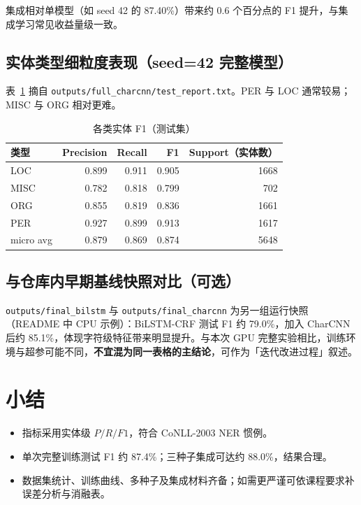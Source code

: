 \documentclass[UTF8,a4paper]{ctexart}
\begin{document}
集成相对单模型（如 seed 42 的 87.40\%）带来约 0.6 个百分点的 F1 提升，与集成学习常见收益量级一致。

\subsection{实体类型细粒度表现（seed=42 完整模型）}
表~\ref{tab:pertype} 摘自 \texttt{outputs/full\_charcnn/test\_report.txt}。PER 与 LOC 通常较易；MISC 与 ORG 相对更难。

\begin{table}[htbp]
  \centering
  \caption{各类实体 F1（测试集）}
  \label{tab:pertype}
  \begin{tabular}{lrrrr}
    \toprule
    类型 & Precision & Recall & F1 & Support（实体数） \\
    \midrule
    LOC & 0.899 & 0.911 & 0.905 & 1668 \\
    MISC & 0.782 & 0.818 & 0.799 & 702 \\
    ORG & 0.855 & 0.819 & 0.836 & 1661 \\
    PER & 0.927 & 0.899 & 0.913 & 1617 \\
    micro avg & 0.879 & 0.869 & 0.874 & 5648 \\
    \bottomrule
  \end{tabular}
\end{table}

\subsection{与仓库内早期基线快照对比（可选）}
\texttt{outputs/final\_bilstm} 与 \texttt{outputs/final\_charcnn} 为另一组运行快照（README 中 CPU 示例）：BiLSTM-CRF 测试 F1 约 79.0\%，加入 CharCNN 后约 85.1\%，体现字符级特征带来明显提升。与本次 GPU 完整实验相比，训练环境与超参可能不同，\textbf{不宜混为同一表格的主结论}，可作为「迭代改进过程」叙述。

\section{小结}

\begin{itemize}
  \item 指标采用实体级 $P/R/F1$，符合 CoNLL-2003 NER 惯例。
  \item 单次完整训练测试 F1 约 87.4\%；三种子集成可达约 88.0\%，结果合理。
  \item 数据集统计、训练曲线、多种子及集成材料齐备；如需更严谨可依课程要求补误差分析与消融表。
\end{itemize}
\end{document}
